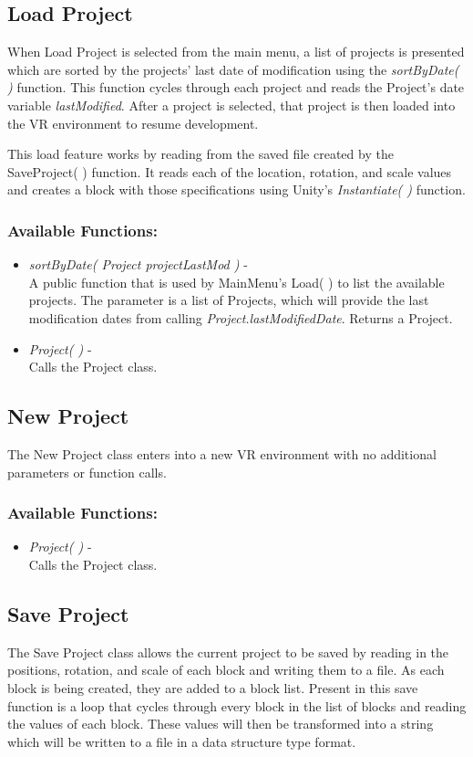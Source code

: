 \documentclass[draftclsnofoot,onecolumn,compsoc]{IEEEtran}
\begin{document}
\subsection{Load Project}
When Load Project is selected from the main menu, a list of projects is  presented which are sorted by the projects' last date of modification using the \textit{sortByDate( )} function. This function cycles through each project and reads the Project's date variable \textit{lastModified}. After a project is selected, that project is then loaded into the VR environment to resume development.

This load feature works by reading from the saved file created by the SaveProject( ) function. It reads each of the location, rotation, and scale values and creates a block with those specifications using Unity's \textit{Instantiate( )} function.

\subsubsection{Available Functions:}
\begin{itemize}
\item \textit{sortByDate( Project projectLastMod )} -\\
A public function that is used by MainMenu's Load( ) to list the available projects. The parameter is a list of Projects, which will provide the last modification dates from calling \textit{Project.lastModifiedDate}. Returns a Project.
\item \textit{Project( )} -\\
Calls the Project class.
\end{itemize}

\subsection{New Project}
The New Project class enters into a new VR environment with no additional parameters or function calls.

\subsubsection{Available Functions:}
\begin{itemize}
\item \textit{Project( )} -\\
Calls the Project class.
\end{itemize}

\subsection{Save Project}
The Save Project class allows the current project to be saved by reading in the positions, rotation, and scale of each block and writing them to a file. As each block is being created, they are added to a block list. Present in this save function is a loop that cycles through every block in the list of blocks and reading the values of each block. These values will then be transformed into a string which will be written to a file in a data structure type format.
\end{document}
